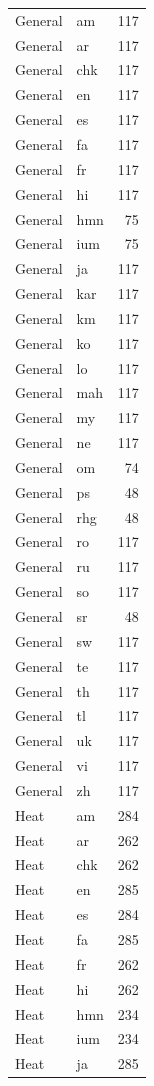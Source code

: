\begin{longtable}{p{3cm} p{3cm} r}
General & am & 117 \\
General & ar & 117 \\
General & chk & 117 \\
General & en & 117 \\
General & es & 117 \\
General & fa & 117 \\
General & fr & 117 \\
General & hi & 117 \\
General & hmn & 75 \\
General & ium & 75 \\
General & ja & 117 \\
General & kar & 117 \\
General & km & 117 \\
General & ko & 117 \\
General & lo & 117 \\
General & mah & 117 \\
General & my & 117 \\
General & ne & 117 \\
General & om & 74 \\
General & ps & 48 \\
General & rhg & 48 \\
General & ro & 117 \\
General & ru & 117 \\
General & so & 117 \\
General & sr & 48 \\
General & sw & 117 \\
General & te & 117 \\
General & th & 117 \\
General & tl & 117 \\
General & uk & 117 \\
General & vi & 117 \\
General & zh & 117 \\
Heat & am & 284 \\
Heat & ar & 262 \\
Heat & chk & 262 \\
Heat & en & 285 \\
Heat & es & 284 \\
Heat & fa & 285 \\
Heat & fr & 262 \\
Heat & hi & 262 \\
Heat & hmn & 234 \\
Heat & ium & 234 \\
Heat & ja & 285 \\

\end{longtable}
